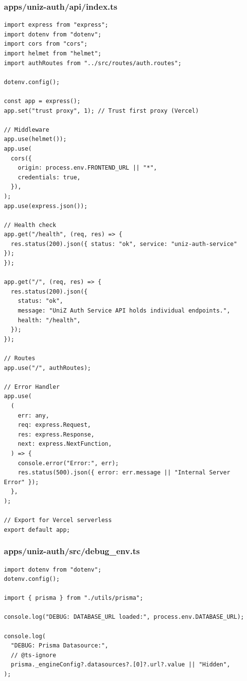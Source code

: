 \documentclass[11pt,a4paper,oneside]{article}
\begin{document}
\subsubsection*{apps/uniz-auth/api/index.ts}
\begin{lstlisting}
import express from "express";
import dotenv from "dotenv";
import cors from "cors";
import helmet from "helmet";
import authRoutes from "../src/routes/auth.routes";

dotenv.config();

const app = express();
app.set("trust proxy", 1); // Trust first proxy (Vercel)

// Middleware
app.use(helmet());
app.use(
  cors({
    origin: process.env.FRONTEND_URL || "*",
    credentials: true,
  }),
);
app.use(express.json());

// Health check
app.get("/health", (req, res) => {
  res.status(200).json({ status: "ok", service: "uniz-auth-service" });
});

app.get("/", (req, res) => {
  res.status(200).json({
    status: "ok",
    message: "UniZ Auth Service API holds individual endpoints.",
    health: "/health",
  });
});

// Routes
app.use("/", authRoutes);

// Error Handler
app.use(
  (
    err: any,
    req: express.Request,
    res: express.Response,
    next: express.NextFunction,
  ) => {
    console.error("Error:", err);
    res.status(500).json({ error: err.message || "Internal Server Error" });
  },
);

// Export for Vercel serverless
export default app;

\end{lstlisting}
\subsubsection*{apps/uniz-auth/src/debug\_env.ts}
\begin{lstlisting}
import dotenv from "dotenv";
dotenv.config();

import { prisma } from "./utils/prisma";

console.log("DEBUG: DATABASE_URL loaded:", process.env.DATABASE_URL);

console.log(
  "DEBUG: Prisma Datasource:",
  // @ts-ignore
  prisma._engineConfig?.datasources?.[0]?.url?.value || "Hidden",
);

\end{lstlisting}
\end{document}
